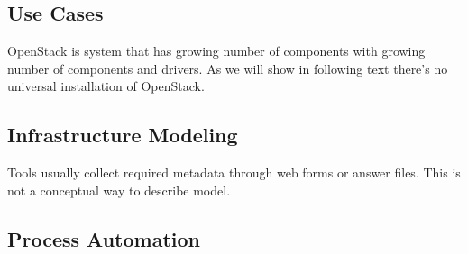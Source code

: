 \subsection{Use Cases}

OpenStack is system that has growing number of components with growing number of components and drivers. As we will show in following text there's no universal installation of OpenStack.  


\subsection{Infrastructure Modeling}

Tools usually collect required metadata through web forms or answer files. This is not a conceptual way to describe model.


\subsection{Process Automation}


